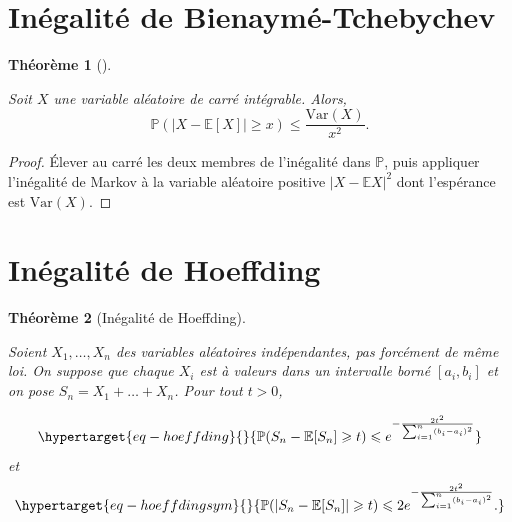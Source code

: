 \documentclass[
  10,
  letterpaper,
  DIV=11,
  numbers=noendperiod]{scrreport}
\theoremstyle{plain}
\newtheorem{theorem}{Théorème}[chapter]
\theoremstyle{definition}
\theoremstyle{plain}
\theoremstyle{definition}
\theoremstyle{definition}
\theoremstyle{plain}
\theoremstyle{remark}
\begin{document}
\hypertarget{inuxe9galituxe9-de-bienaymuxe9-tchebychev}{%
\section{Inégalité de
Bienaymé-Tchebychev}\label{inuxe9galituxe9-de-bienaymuxe9-tchebychev}}

\begin{theorem}[]\protect\hypertarget{thm-bt}{}\label{thm-bt}

Soit \(X\) une variable aléatoire de carré intégrable. Alors,
\[ \mathbb{P}(|X - \mathbb{E}[X]|\geqslant x)\leqslant \frac{\mathrm{Var}(X)}{x^2}.\]

\end{theorem}

\begin{proof}

Élever au carré les deux membres de l'inégalité dans \(\mathbb{P}\),
puis appliquer l'inégalité de Markov à la variable aléatoire positive
\(|X - \mathbb{E}X|^2\) dont l'espérance est \(\mathrm{Var}(X)\).

\end{proof}

\hypertarget{inuxe9galituxe9-de-hoeffding}{%
\section{Inégalité de Hoeffding}\label{inuxe9galituxe9-de-hoeffding}}

\begin{theorem}[Inégalité de
Hoeffding]\protect\hypertarget{thm-hoeffding}{}\label{thm-hoeffding}

Soient \(X_1, \dotsc, X_n\) des variables aléatoires indépendantes, pas
forcément de même loi. On suppose que chaque \(X_i\) est à valeurs dans
un intervalle borné \([a_i, b_i]\) et on pose
\(S_n = X_1 + \dotsc + X_n\). Pour tout \(t>0\),

\begin{equation}\protect\hypertarget{eq-hoeffding}{}{\mathbb{P}(S_n - \mathbb{E}[S_n] \geqslant t) \leqslant e^{-\frac{2t^2}{\sum_{i=1}^n(b_i - a_i)^2}}}\label{eq-hoeffding}\end{equation}
et
\begin{equation}\protect\hypertarget{eq-hoeffdingsym}{}{\mathbb{P}(|S_n - \mathbb{E}[S_n]| \geqslant t) \leqslant 2e^{-\frac{2t^2}{\sum_{i=1}^n(b_i - a_i)^2}}. }\label{eq-hoeffdingsym}\end{equation}

\end{theorem}
\end{document}
